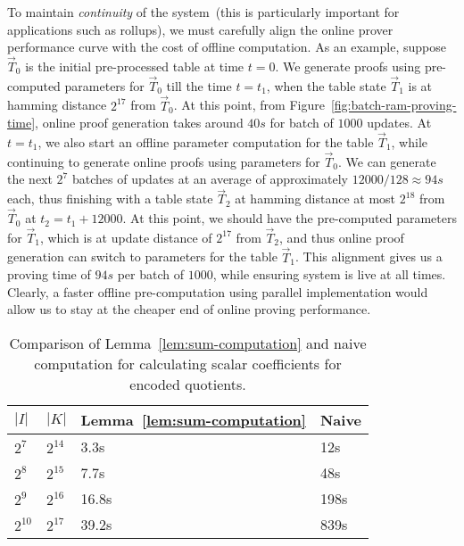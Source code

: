 To maintain {\em continuity} of the system~(this is particularly important for applications such as rollups), we must carefully
align the online prover performance curve with the cost of offline computation.  As an example, suppose $\vec{T}_0$
is the initial pre-processed table at time $t=0$. We generate proofs using pre-computed parameters for $\vec{T}_0$
till the time $t=t_1$, when the table state $\vec{T}_1$ is at hamming distance $2^{17}$ from $\vec{T}_0$. At this point,
from Figure~\ref{fig:batch-ram-proving-time}, online proof generation takes around $40s$ for batch of $1000$ updates.
At $t=t_1$, we also start an offline parameter computation for the table $\vec{T}_1$, while continuing to generate
online proofs using parameters for $\vec{T}_0$. We can generate the next $2^7$ batches of updates at an average of
approximately $12000/128\approx 94s$ each, thus finishing with a table state $\vec{T}_2$ at hamming distance at most
$2^{18}$ from $\vec{T}_0$ at $t_2=t_1+12000$. At this point, we should have the pre-computed parameters for $\vec{T}_1$,
which is at update distance of $2^{17}$ from $\vec{T}_2$, and thus online proof generation can switch to parameters
for the table $\vec{T}_1$. This alignment gives us a proving time of $94s$ per batch of $1000$, while ensuring system
is live at all times. Clearly, a faster offline pre-computation using parallel implementation would allow us to stay
at the cheaper end of online proving performance.


\begin{table}[htbp]
    \centering
    \begin{tabularx}{0.45\textwidth}{@{}XXXX@{}}
        \toprule
        $|I|$ & $|K|$ & Lemma~\ref{lem:sum-computation} & Naive \\ \midrule
        $2^7$ & $2^{14}$ & 3.3s  & 12s \\
        $2^8$ & $2^{15}$ & 7.7s  & 48s \\
        $2^9$ & $2^{16}$ & 16.8s & 198s \\
        $2^{10}$ & $2^{17}$ & 39.2s & 839s \\
        \bottomrule
    \end{tabularx}
    \caption{Comparison of Lemma~\ref{lem:sum-computation} and naive computation for calculating
    scalar coefficients for encoded quotients.}
    \label{tbl:sum-computation-compare}
    \vspace*{-5mm}
\end{table}


